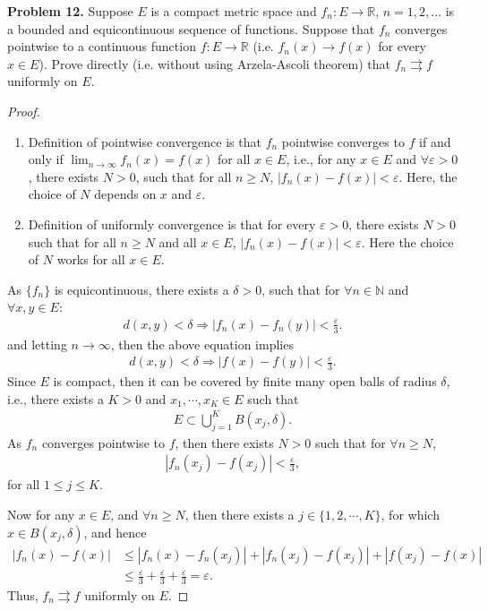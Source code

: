 \documentclass[12pt]{article}
\theoremstyle{definition}
\theoremstyle{definition}
\numberwithin{equation}{subsection}
\begin{document}
\medskip

\noindent
{\bf Problem 12.}
Suppose $E$ is a compact metric space and $f_n:E\to\mathbb{R}$,
$n=1,2,\ldots$ is a bounded and equicontinuous sequence of functions. Suppose that $f_n$ converges pointwise to a continuous
function $f:E\to\mathbb{R}$ (i.e. $f_n(x)\to f(x)$ for every $x\in E$). Prove directly (i.e. without using Arzela-Ascoli theorem)
that $f_n\rightrightarrows f$ uniformly on $E$.
\begin{proof}
~\begin{enumerate}[label=(\arabic*)]
    \item Definition of pointwise convergence is that $f_n$ pointwise converges to $f$ if and only if $\lim_{n\to \infty}f_n(x) = f(x)$ for all $x\in E$, i.e., for any $x\in E$ and $\forall \varepsilon > 0$, there exists $N > 0$, such that for all $n \geq N$, $|f_n(x) - f(x)| < \varepsilon$. Here, the choice of $N$ depends on $x$ and $\varepsilon$.
    \item Definition of uniformly convergence is that for every $\varepsilon > 0$, there exists $N > 0$ such that for all $n\geq N$ and all $x\in E$, $|f_n(x) - f(x)| < \varepsilon$. Here the choice of $N$ works for all $x \in E$.
\end{enumerate}

As $\{f_n\}$ is equicontinuous, there exists a $\delta > 0$, such that for $\forall n \in\mathbb{N}$ and $\forall x,y\in E$:
\begin{align*}
    d(x,y) < \delta \Longrightarrow |f_n(x) - f_n(y)| < \frac{\varepsilon}{3}.
\end{align*}
and letting $n\to \infty$, then the above equation implies
\begin{align*}
    d(x,y) < \delta \Longrightarrow |f(x) - f(y)| < \frac{\varepsilon}{3}.
\end{align*}
Since $E$ is compact, then it can be covered by finite many open balls of radius $\delta$, i.e., there exists a $K > 0$ and $x_1, \cdots, x_K \in E$ such that 
\begin{align*}
    E \subset \bigcup^K_{j=1} B\left(x_j, \delta\right).
\end{align*}
As $f_n$ converges pointwise to $f$, then there exists $N > 0$ such that for $\forall n \geq N$, 
\begin{align*}
    |f_n(x_j) - f(x_j)| < \frac{\varepsilon}{3},
\end{align*}
for all $1\leq j \leq K$.

Now for any $x\in E$, and $\forall n \geq N$, then there exists a $j\in \{1,2,\cdots,K\}$, for which $x\in B(x_j,\delta)$, and hence
\begin{align*}
    |f_n(x) - f(x)| & \leq |f_n(x) - f_n(x_j)| + |f_n(x_j) - f(x_j)| + |f(x_j) - f(x)| \\
    & \leq \frac{\varepsilon}{3} + \frac{\varepsilon}{3} + \frac{\varepsilon}{3} = \varepsilon.
\end{align*}
Thus, $f_n\rightrightarrows f$ uniformly on $E$.
\end{proof}
\end{document}
